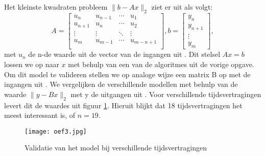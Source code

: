 Het kleinste kwadraten probleem $ \lVert b-Ax \rVert_2$ ziet er uit als volgt:
$$A = \begin{bmatrix} 
u_n 		&u_{n-1} 	&\cdots	&u_1\\
u_{n+1}	&u_n		&\cdots	&u_2 \\
\vdots	&\vdots	&\ddots	&\vdots \\
u_m 		&u_{m-1}	&\cdots	&u_{m-n+1} \\
\end{bmatrix}  ,b = \begin{bmatrix} 
y_n\\
y_{n+1}\\
\vdots\\
y_m
\end{bmatrix},$$
met $u_n$ de n-de waarde uit de vector van de ingangen uit .
Dit stelsel $Ax=b$ lossen we op naar $x$ met behulp van een van de algoritmes uit de vorige opgave. Om dit model te valideren stellen we op analoge wijze een matrix B op met de ingangen uit . We vergelijken de verschillende modellen met behulp van de waarde $ \lVert y-Bx \rVert_2$ met y de uitgangen uit . Voor verschillende tijdsvertragingen levert dit de waardes uit figuur \ref{fig:oef3}. Hieruit blijkt dat 18 tijdsvertragingen het meest interessant is, of $n=19$.
\begin{figure}[H]
    \centering
    \texttt{[image: oef3.jpg]}
    \caption{Validatie van het model bij verschillende tijdsvertragingen}
    \label{fig:oef3}
\end{figure}
